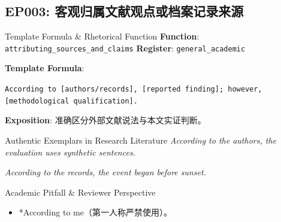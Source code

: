 \subsection{EP003: 客观归属文献观点或档案记录来源}\label{sec:ep:EP003}
\begin{ConceptBox}{Template Formula \& Rhetorical Function}
\textbf{Function}: \texttt{attributing\_sources\_and\_claims} \quad \textbf{Register}: \texttt{general\_academic}\par\vspace{3pt}
\textbf{Template Formula}:\par\noindent\texttt{According to [authors/records], [reported finding]; however, [methodological qualification].}\par\vspace{4pt}
\textbf{Exposition}: 准确区分外部文献说法与本文实证判断。
\end{ConceptBox}
\begin{ExampleBox}{Authentic Exemplars in Research Literature}
\textit{According to the authors, the evaluation uses synthetic sentences.}\par\vspace{2pt}
\textit{According to the records, the event began before sunset.}\par\vspace{2pt}
\end{ExampleBox}
\begin{TipBox}{Academic Pitfall \& Reviewer Perspective}
\begin{itemize}[leftmargin=1.5em, itemsep=1pt]
  \item *According to me（第一人称严禁使用）。
\end{itemize}
\end{TipBox}
\vspace{6pt}
